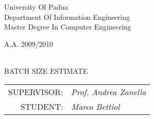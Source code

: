 \begin{titlepage}

		\thispagestyle{empty}
    \begin{figure}
    \centering
      \quad   \hspace{1cm}  
    \end{figure}
    
    \vskip 3cm{
    \begin{center}\sc
        University Of Padua\\
        Department Of Information Engineering\\
        Master Degree In Computer Engineering\end{center}
		}
		
		\vskip1.2cm\begin{center}
      \rm\large\uppercase\expandafter{A.A. 2009/2010\\}
 \end{center}
    	
    \vskip 2.5cm\begin{center}
    \HRule \\[0.4cm]\LARGE\expandafter{BATCH SIZE ESTIMATE}
    \HRule \\[0.4cm]
    \end{center}
    
    \begin{flushright}\vskip4.0cm 
    \begin{tabular}{rl}
            \rm\large \uppercase{Supervisor:} &\emph{Prof. Andrea Zanella}\\
	   \rm\large \uppercase{Student:} &\emph{Marco Bettiol} \\
		\end{tabular}
     \end{flushright}
    \vfill
    
\end{titlepage}


\newpage

